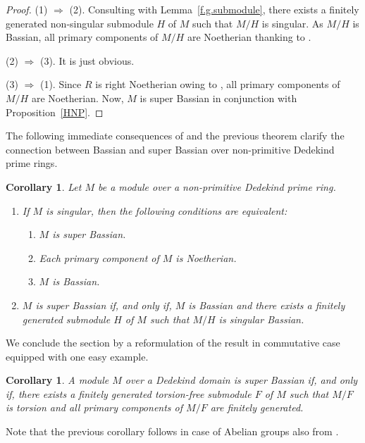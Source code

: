\documentclass{amsart}
\newtheorem{cor}[thm]{Corollary}
\theoremstyle{definition}
\begin{document}
\begin{proof} (1) $\Rightarrow$ (2). Consulting with Lemma~\ref{f.g.submodule}, there exists a finitely generated non-singular submodule $H$ of $M$ such that $M/H$ is singular. As $M/H$ is Bassian, all primary components of $M/H$ are Noetherian thanking to \cite[Theorem 1]{T}.

(2) $\Rightarrow$ (3). It is just obvious.

(3) $\Rightarrow$ (1). Since $R$ is right Noetherian owing to \cite[Remark 2]{T}, all primary components of $M/H$ are Noetherian. Now, $M$ is super Bassian in conjunction with Proposition~\ref{HNP}.
\end{proof}

The following immediate consequences of \cite[Theorem 1]{T} and the previous theorem clarify the connection between Bassian and super Bassian over non-primitive Dedekind prime rings.

\begin{cor}\label{sB} Let $M$ be a module over a non-primitive Dedekind prime ring.
\begin{enumerate}
\item[(1)] If $M$ is singular, then the following conditions are equivalent:
\begin{enumerate}
\item[(a)] $M$ is super Bassian.
\item[(b)] Each primary component of $M$ is Noetherian.
\item[(c)] $M$ is Bassian.
\end{enumerate}
\item[(2)] $M$ is super Bassian if, and only if, $M$ is Bassian and there exists a finitely generated submodule $H$ of $M$ such that $M/H$ is singular Bassian.
\end{enumerate}
\end{cor}

We conclude the section by a reformulation of the result in commutative case equipped with one easy example.

\begin{cor}\label{sBcom} A module $M$ over a Dedekind domain is super Bassian if, and only if, there exists a finitely generated torsion-free submodule $F$ of $M$ such that $M/F$ is torsion and all primary components of $M/F$ are finitely generated.
\end{cor}

Note that the previous corollary follows in case of Abelian groups also from \cite[Theorem 2.5]{DG}.
\end{document}
